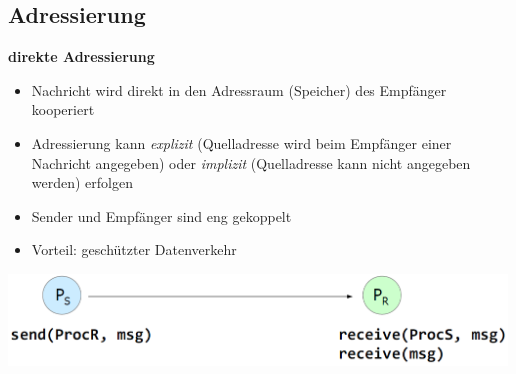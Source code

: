 \documentclass{report}
\newenvironment{Figure}
	{\par\medskip\noindent\minipage{\linewidth}}
	{\endminipage\par\medskip}
\theoremstyle{definition}
\theoremstyle{example}
\begin{document}
	\subsection{Adressierung}
\textbf{direkte Adressierung}
\begin{itemize}
	\item Nachricht wird direkt in den Adressraum (Speicher) des Empfänger kooperiert
	\item Adressierung kann \textit{explizit} (Quelladresse wird beim Empfänger einer Nachricht angegeben) oder \textit{implizit} (Quelladresse kann nicht angegeben werden) erfolgen
	\item Sender und Empfänger sind eng gekoppelt
	\item Vorteil: geschützter Datenverkehr
\end{itemize}
\begin{Figure}
\centering
\includegraphics[width=500px]{img/MessagePassingDirekteAdressierung.png}
	\label{fig:Beispiel einer direkten Adressierung}
\end{Figure}
\end{document}
